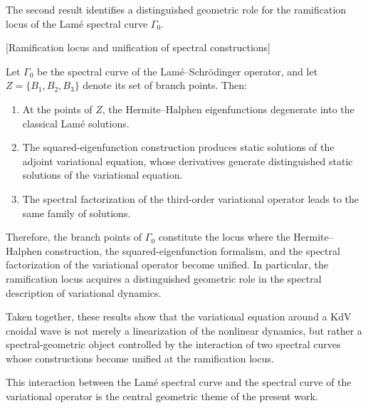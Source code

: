 \documentclass[a4paper,12pt]{article}
\begin{document}
\medskip

The second result identifies a distinguished geometric role for the ramification locus of the Lam\'e spectral curve $\Gamma_0$.

\medskip

 [Ramification locus and unification of spectral constructions]
{\it 

Let \( \Gamma_0 \) be the spectral curve of the Lamé--Schrödinger operator, and let
\( Z=\{B_1,B_2,B_3\} \) denote its set of branch points. Then:
\begin{enumerate}
\item At the points of $Z$, the Hermite--Halphen eigenfunctions degenerate into the classical Lam\'e solutions.

\item The squared-eigenfunction construction produces static solutions of the adjoint variational equation, whose derivatives generate distinguished static solutions of the variational equation.

\item The spectral factorization of the third-order variational operator leads to the same family of solutions.

\end{enumerate}
}

Therefore, the branch points of $\Gamma_0$ constitute the locus where the Hermite--Halphen construction, the squared-eigenfunction formalism, and the spectral factorization of the variational operator become unified. In particular, the ramification locus acquires a distinguished geometric role in the spectral description of variational dynamics.

\medskip

Taken together, these results show that the variational equation around a KdV cnoidal wave is not merely a linearization of the nonlinear dynamics, but rather a spectral-geometric object controlled by the interaction of two spectral curves whose constructions become unified at the ramification locus.


This interaction between the Lamé spectral curve and the spectral curve of the variational operator is the central geometric theme of the present work.


\bigskip
\end{document}

